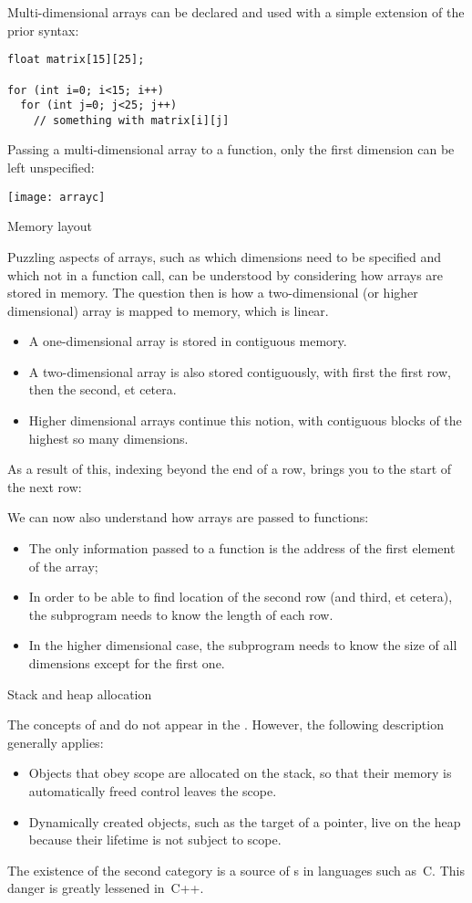 Multi-dimensional arrays can be declared and used with a simple extension of
the prior syntax:
\begin{lstlisting}
float matrix[15][25];

for (int i=0; i<15; i++)
  for (int j=0; j<25; j++)
    // something with matrix[i][j]
\end{lstlisting}

Passing a multi-dimensional array to a function, only the first
dimension can be left unspecified:
%

\texttt{[image: arrayc]}

 {Memory layout}

Puzzling aspects of arrays, such as which dimensions need to be
specified and which not in a function call, can be understood by
considering how arrays are stored in memory.
The question then is how a two-dimensional (or higher dimensional)
array is mapped to memory, which is linear.
\begin{itemize}
\item A one-dimensional array is stored in contiguous memory.
\item A two-dimensional array is also stored contiguously, with first
  the first row, then the second, et cetera.
\item Higher dimensional arrays continue this notion, with contiguous
  blocks of the highest so many dimensions.
\end{itemize}

As a result of this, indexing beyond the end of a row, brings you to the
start of the next row:
%

We can now also understand how arrays are passed to functions:
\begin{itemize}
\item The only information passed to a function is the address of the
  first element of the array;
\item In order to be able to find location of the second row (and
  third, et cetera), the subprogram needs to know the length of each
  row.
\item In the higher dimensional case, the subprogram needs to know the
  size of all dimensions except for the first one.
\end{itemize}

 {Stack and heap allocation}
\label{sec:stack-heap}

The concepts of  and  do not appear
in the . However, the following
description generally applies:
\begin{itemize}
\item Objects that obey scope are allocated on the stack, so that
  their memory is automatically freed control leaves the scope.
\item Dynamically created objects, such as the target of a pointer,
  live on the heap because their lifetime is not subject to scope.
\end{itemize}
The existence of the second category is a source of
s in languages such as~C. This danger is
greatly lessened in~C++.

